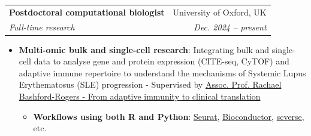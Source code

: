 \documentclass{article}
\makeatletter
\newcommand{\resumeItem}[2]{
  \item\small{
    \textbf{#1}{: #2 \vspace{-2pt}}
  }
}
\newcommand{\resumeSubheading}[4]{
  \vspace{-1pt}\item
    \begin{tabular*}{0.97\textwidth}[t]{l@{\extracolsep{\fill}}r}
      \textbf{#1} & #2 \\
      \textit{\small#3} & \textit{\small #4} \\
    \end{tabular*}\vspace{-5pt}
}
\newcommand{\resumeItemListStart}{\begin{itemize}}
\newcommand{\resumeItemListEnd}{\end{itemize}\vspace{-5pt}}
\makeatother
\begin{document}
        \resumeSubheading
        {Postdoctoral computational biologist}{University of Oxford, UK}{Full-time research}{Dec. 2024 -- present}
            \resumeItemListStart
                \resumeItem{Multi-omic bulk and single-cell research} {Integrating bulk and single-cell data to analyse gene and protein expression (CITE-seq, CyTOF) and adaptive immune repertoire to understand the mechanisms of Systemic Lupus Erythematosus (SLE) progression - Supervised by \href{https://www.bioch.ox.ac.uk/research/bashford-rogers}{Assoc. Prof. Rachael Bashford-Rogers - From adaptive immunity to clinical translation}}
                    \begin{itemize}
                        \resumeItem {Workflows using both R and Python}{\href{ https://satijalab.org/seurat/}{Seurat}, \href{https://bioconductor.org/books/release/OSCA/}{Bioconductor}, \href{https://scverse.org}{scverse}, etc.}
                    \end{itemize}
            \resumeItemListEnd
            
\end{document}
